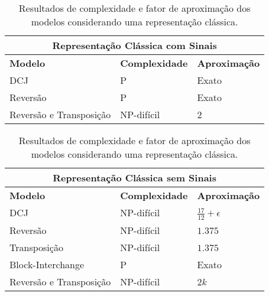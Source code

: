\begin{table}[!htb]
  \caption{Resultados de complexidade e fator de aproximação dos modelos considerando uma representação clássica.}
  \label{table:XZPFGPAM}
  \centering
  \begin{tabular}{|p{8cm}|p{3cm}|p{3cm}|}
    \hline
    \multicolumn{3}{|c|}{\textbf{Representação Clássica com Sinais}}                                                             \\ \hline
    {\bf Modelo}                  & {\bf Complexidade}                                 & {\bf Aproximação}                       \\ \hline
    DCJ                     & P~\cite{2005-yancopoulos-etal}               & Exato~\cite{2005-yancopoulos-etal}                  \\ \hline
    Reversão                & P~\cite{1999-hannenhalli-pevzner}            & Exato~\cite{1999-hannenhalli-pevzner}               \\ \hline
    Reversão e Transposição & NP-difícil~\cite{2019b-oliveira-etal}        & $2$~\cite{1998-walter-etal}                         \\ \hline
  \end{tabular}

  \hfill \break

  \begin{tabular}{|p{8cm}|p{3cm}|p{3cm}|}
    \hline
    \multicolumn{3}{|c|}{\textbf{Representação Clássica sem Sinais}}                                                             \\ \hline
    {\bf Modelo}                  & {\bf Complexidade}                                 & {\bf Aproximação}                       \\ \hline
    DCJ                     & NP-difícil~\cite{2013-chen}                  & $\frac{17}{12}+\epsilon$~\cite{2013-chen}           \\ \hline
    Reversão                & NP-difícil~\cite{1999a-caprara}              & $1.375$~\cite{2002-berman-etal}                     \\ \hline
    Transposição            & NP-difícil~\cite{2012-bulteau-etal}          & $1.375$~\cite{2006-elias-hartman,2022-silva-etal}   \\ \hline
    Block-Interchange       & P~\cite{1996-christie}                       & Exato~\cite{1996-christie}                          \\ \hline
    Reversão e Transposição & NP-difícil~\cite{2019b-oliveira-etal}        & $2k$~\cite{2008-rahman-etal,2013-chen}              \\ \hline
  \end{tabular}
\end{table}